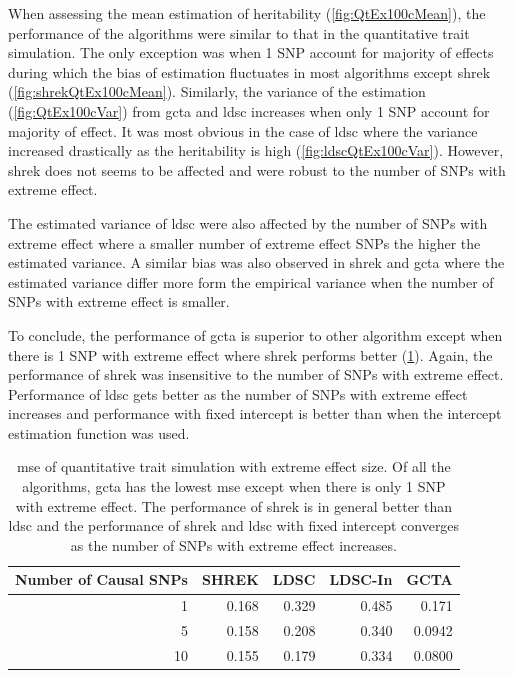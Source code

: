 		When assessing the mean estimation of heritability (\cref{fig:QtEx100cMean}), the performance of the algorithms were similar to that in the quantitative trait simulation.
		The only exception was when 1 \gls{SNP} account for majority of effects during which the bias of estimation fluctuates in most algorithms except \gls{shrek} (\cref{fig:shrekQtEx100cMean}). 
		Similarly, the variance of the estimation (\cref{fig:QtEx100cVar}) from \gls{gcta} and \gls{ldsc} increases when only 1 \gls{SNP} account for majority of effect.
		It was most obvious in the case of \gls{ldsc} where the variance increased drastically as the heritability is high (\cref{fig:ldscQtEx100cVar}).
		However, \gls{shrek} does not seems to be affected and were robust to the number of \glspl{SNP} with extreme effect. 
		
		The estimated variance of \gls{ldsc} were also affected by the number of \glspl{SNP} with extreme effect where a smaller number of extreme effect \glspl{SNP} the higher the estimated variance. 
		A similar bias was also observed in \gls{shrek} and \gls{gcta} where the estimated variance differ more form the empirical variance when the number of \glspl{SNP} with extreme effect is smaller. 
		
		To conclude, the performance of \gls{gcta} is superior to other algorithm except when there is 1 \gls{SNP} with extreme effect where \gls{shrek} performs better (\cref{tab:mseEx100c}).
		Again, the performance of \gls{shrek} was insensitive to the number of \glspl{SNP} with extreme effect.
		Performance of \gls{ldsc} gets better as the number of \glspl{SNP} with extreme effect increases and performance with fixed intercept is better than when the intercept estimation function was used. 
		 
		\begin{table}
			\centering
			\begin{tabular}{rrrrr}
				\toprule
				Number of Causal SNPs&	SHREK&	LDSC&	LDSC-In&	GCTA \\
				\midrule
				1	&	0.168	&	0.329	&	0.485	&	0.171\\
				5	&	0.158	&	0.208	&	0.340	&	0.0942\\
				10	&	0.155	&	0.179	&	0.334	&	0.0800\\
				\bottomrule
			\end{tabular}
			\caption[Mean Squared Error of Quantitative Trait Simulation with Extreme Effect Size]{
				\gls{mse} of quantitative trait simulation with extreme effect size.
				Of all the algorithms, \gls{gcta} has the lowest \gls{mse} except when there is only 1 \gls{SNP} with extreme effect.
				The performance of \gls{shrek} is in general better than \gls{ldsc} and the performance of \gls{shrek} and \gls{ldsc} with fixed intercept converges as the number of \glspl{SNP} with extreme effect increases.}
			\label{tab:mseEx100c}
		\end{table}
		
